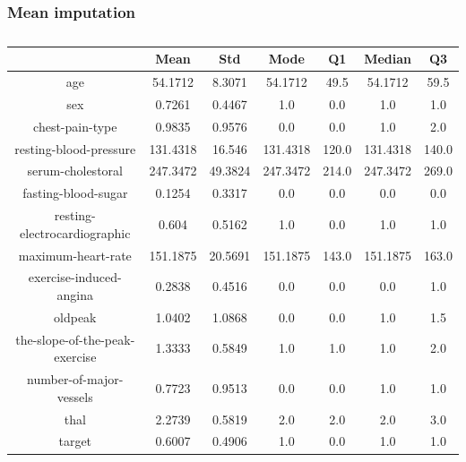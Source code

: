 \documentclass{classrep}
\begin{document}
{{            \subsubsection{Mean imputation}
            \label{results:15-percent:mean-input} {
                \begin{table}[!htbp]
                    \centering
                    \begin{tabular}{|c|c|c|c|c|c|c|}
                        \hline
                        & Mean & Std & Mode & Q1 & Median & Q3 \\ \hline
                        age & 54.1712 & 8.3071 & 54.1712 & 49.5 & 54.1712 & 59.5 \\ \hline
                        sex & 0.7261 & 0.4467 & 1.0 & 0.0 & 1.0 & 1.0 \\ \hline
                        chest-pain-type & 0.9835 & 0.9576 & 0.0 & 0.0 & 1.0 & 2.0 \\ \hline
                        resting-blood-pressure & 131.4318 & 16.546 & 131.4318 & 120.0 & 131.4318 & 140.0 \\ \hline
                        serum-cholestoral & 247.3472 & 49.3824 & 247.3472 & 214.0 & 247.3472 & 269.0 \\ \hline
                        fasting-blood-sugar & 0.1254 & 0.3317 & 0.0 & 0.0 & 0.0 & 0.0 \\ \hline
                        resting-electrocardiographic & 0.604 & 0.5162 & 1.0 & 0.0 & 1.0 & 1.0 \\ \hline
                        maximum-heart-rate & 151.1875 & 20.5691 & 151.1875 & 143.0 & 151.1875 & 163.0 \\ \hline
                        exercise-induced-angina & 0.2838 & 0.4516 & 0.0 & 0.0 & 0.0 & 1.0 \\ \hline
                        oldpeak & 1.0402 & 1.0868 & 0.0 & 0.0 & 1.0 & 1.5 \\ \hline
                        the-slope-of-the-peak-exercise & 1.3333 & 0.5849 & 1.0 & 1.0 & 1.0 & 2.0 \\ \hline
                        number-of-major-vessels & 0.7723 & 0.9513 & 0.0 & 0.0 & 1.0 & 1.0 \\ \hline
                        thal & 2.2739 & 0.5819 & 2.0 & 2.0 & 2.0 & 3.0 \\ \hline
                        target & 0.6007 & 0.4906 & 1.0 & 0.0 & 1.0 & 1.0 \\ \hline
                    \end{tabular}
                    \caption{}
                    \label{result_15_Mean-imputation}
                \end{table}
                \FloatBarrier

}}}
\end{document}
